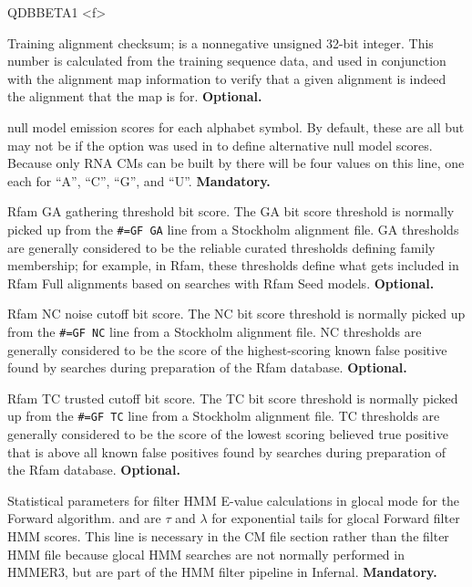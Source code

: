 \begin{sreitems}{QDBBETA1 <f>}
\item [\emprog{CKSUM <d>}] Training alignment checksum;  is
  a nonnegative unsigned 32-bit integer. This number is calculated
  from the training sequence data, and used in conjunction with the
  alignment map information to verify that a given alignment is indeed
  the alignment that the map is for. \textbf{Optional.}

\item [\emprog{NULL <f> <f> <f> <f>}] null model emission scores for
  each alphabet symbol. By default, these are all  but may
  not be if the  option was used in  to
  define alternative null model scores. Because only RNA CMs can be
  built by  there will be four values on this line, one
  each for ``A'', ``C'', ``G'', and ``U''. \textbf{Mandatory.}

\item [\emprog{GA <f>}] Rfam GA gathering threshold bit score.  The GA
bit score threshold is normally picked up from the \verb+#=GF GA+ line
from a Stockholm alignment file.  GA thresholds are generally
considered to be the reliable curated thresholds defining family
membership; for example, in Rfam, these thresholds define what gets
included in Rfam Full alignments based on searches with Rfam Seed
models. \textbf{Optional.}

\item [\emprog{NC <f>}] Rfam NC noise cutoff bit score.
The NC bit score threshold is normally picked up from the
\verb+#=GF NC+ line from a Stockholm alignment file.  
NC thresholds are generally considered to be the
score of the highest-scoring known false positive found by searches
during preparation of the Rfam database. \textbf{Optional.}

\item [\emprog{TC <f>}] Rfam TC trusted cutoff bit score.
The TC bit score threshold is normally picked up from the
\verb+#=GF TC+ line from a Stockholm alignment file.  
TC thresholds are generally considered to be the score of the lowest
scoring believed true positive that is above all known false positives
found by searches during preparation of the Rfam database.
\textbf{Optional.}

\item [\emprog{EFP7GF <f1> <f2>}] Statistical parameters for filter HMM
  E-value calculations in glocal mode for the Forward algorithm. 
   and  are $\tau$ and $\lambda$ for exponential
  tails for glocal Forward filter HMM scores. This line is necessary
  in the CM file section rather than the filter HMM file because
  glocal HMM searches are not normally performed in HMMER3, but are
  part of the HMM filter pipeline in Infernal. \textbf{Mandatory.}


\end{sreitems}
